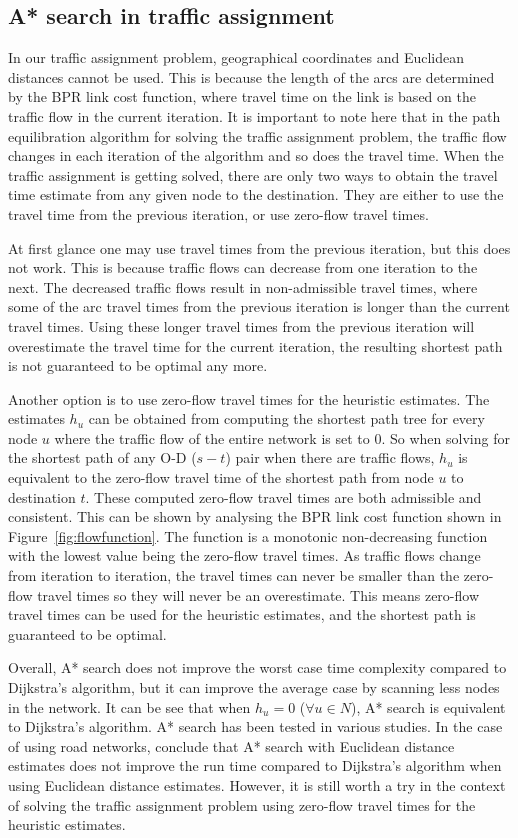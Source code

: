 \subsection{A* search in traffic assignment}
In our traffic assignment problem,
geographical coordinates and Euclidean distances cannot be used.
This is because the length of the arcs are determined by the BPR link cost function,
where travel time on the link is based on the traffic flow in the current iteration.
It is important to note here that in the path equilibration algorithm for solving the traffic assignment problem,
the traffic flow changes in each iteration of the algorithm and so does the travel time.
When the traffic assignment is getting solved,
there are only two ways to obtain the travel time estimate from any given node to the destination.
They are either to use the travel time from the previous iteration,
or use zero-flow travel times.

At first glance one may use travel times from the previous iteration,
but this does not work.
This is because traffic flows can decrease from one iteration to the next.
The decreased traffic flows result in non-admissible travel times,
where some of the arc travel times from the previous iteration is longer than the current travel times.
Using these longer travel times from the previous iteration will overestimate the travel time for the current iteration,
the resulting shortest path is not guaranteed to be optimal any more.

Another option is to use zero-flow travel times for the heuristic estimates.
The estimates $h_u$ can be obtained from computing the shortest path tree for every node $u$ where the traffic flow of the entire network is set to 0.
So when solving for the shortest path of any O-D ($s-t$) pair when there are traffic flows,
$h_u$ is equivalent to the zero-flow travel time of the shortest path from node $u$ to destination $t$.
These computed zero-flow travel times are both admissible and consistent.
This can be shown by analysing the BPR link cost function shown in Figure~\ref{fig:flowfunction}.
The function is a monotonic non-decreasing function with the lowest value being the zero-flow travel times.
As traffic flows change from iteration to iteration,
the travel times can never be smaller than the zero-flow travel times so they will never be an overestimate.
This means zero-flow travel times can be used for the heuristic estimates, and the shortest path is guaranteed to be optimal.

Overall, A* search does not improve the worst case time complexity compared to Dijkstra's algorithm,
but it can improve the average case by scanning less nodes in the network.
It can be see that when $h_u = 0$ ($\forall u \in N$), A* search is equivalent to Dijkstra's algorithm.
A* search has been tested in various studies.
In the case of using road networks,
\citet{GoldbergLandmarks} conclude that A* search with Euclidean distance estimates does not improve the run time compared to Dijkstra's algorithm when using Euclidean distance estimates.
However, it is still worth a try in the context of solving the traffic assignment problem using zero-flow travel times for the heuristic estimates.

